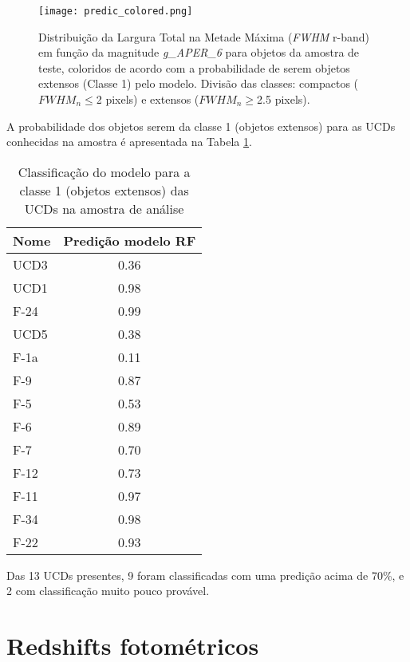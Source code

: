 \begin{figure}[!ht]
    \centering
    \texttt{[image: predic\_colored.png]}
    \caption[]{Distribuição da Largura Total na Metade Máxima (\textit{FWHM} r-band) em função da magnitude \textit{g\_APER\_6} para objetos da amostra de teste, coloridos de acordo com a probabilidade de serem objetos extensos (Classe 1) pelo modelo. Divisão das classes: compactos ($\textit{FWHM}_n$$\leq$2 pixels) e extensos ($\textit{FWHM}_n$$\geq$2.5 pixels).}
    \label{predic_colored}
\end{figure}

A probabilidade dos objetos serem da classe 1 (objetos extensos) para as UCDs conhecidas na amostra é apresentada na Tabela \ref{ucds_predict}.

\begin{table}[H]
    \centering
    \caption{Classificação do modelo para a classe 1 (objetos extensos) das UCDs na amostra de análise}  
    \begin{tabular}{lc}
        \toprule
        Nome & Predição modelo RF \\
        \midrule
        UCD3 & 0.36 \\
        UCD1 & 0.98 \\
        F-24 & 0.99 \\
        UCD5 & 0.38 \\
        F-1a & 0.11 \\
        F-9 & 0.87 \\
        F-5 & 0.53 \\
        F-6 & 0.89 \\
        F-7 & 0.70 \\
        F-12 & 0.73 \\
        F-11 & 0.97 \\
        F-34 & 0.98 \\
        F-22 & 0.93 \\
        \bottomrule
    \end{tabular}
    \label{ucds_predict}
\end{table}

Das 13 UCDs presentes, 9 foram classificadas com uma predição acima de 70\%, e 2 com classificação muito pouco provável. 

\section{Redshifts fotométricos}\label{sec:zphot}


